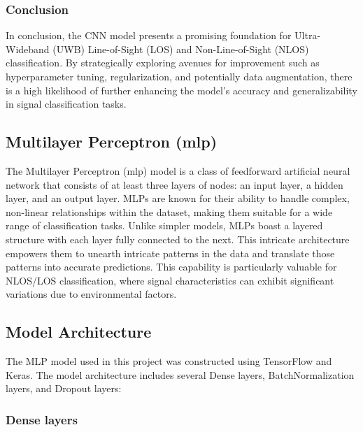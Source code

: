 \subsubsection{Conclusion}

In conclusion, the CNN model presents a promising foundation for Ultra-Wideband (UWB) Line-of-Sight (LOS) and Non-Line-of-Sight (NLOS) classification. By strategically exploring avenues for improvement such as hyperparameter tuning, regularization, and potentially data augmentation, there is a high likelihood of further enhancing the model's accuracy and generalizability in signal classification tasks.





\subsection{Multilayer Perceptron (\gls{mlp})}\label{mlp}                                                                                 
The Multilayer Perceptron (\gls{mlp}) model is a class of feedforward artificial neural network that consists of at least three layers of nodes: an input layer, a hidden layer, and an output layer. MLPs are known for their ability to handle complex, non-linear relationships within the dataset, making them suitable for a wide range of classification tasks. Unlike simpler models, MLPs boast a layered structure with each layer fully connected to the next. This intricate architecture empowers them to unearth intricate patterns in the data and translate those patterns into accurate predictions. This capability is particularly valuable for NLOS/LOS classification, where signal characteristics can exhibit significant variations due to environmental factors.

\subsection{Model Architecture}

The MLP model used in this project was constructed using TensorFlow and Keras. The model architecture includes several Dense layers, BatchNormalization layers, and Dropout layers:

\subsubsection{Dense layers}

